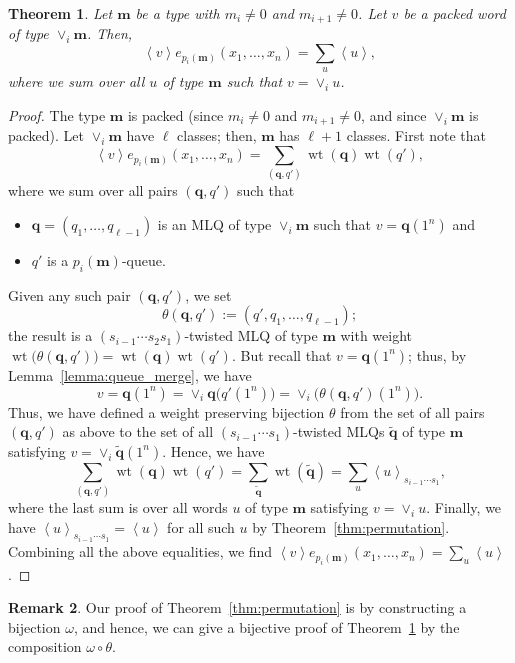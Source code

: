 \documentclass[reqno]{amsart}
\newcommand{\0}{\phantom{c}}
\newcommand{\swt}[1]{\left\langle #1 \right\rangle} %
\newcommand{\merge}[1]{\vee_{#1}} %
\DeclareMathOperator{\wt}{wt} %
\newcommand{\mm}{\mathbf{m}}
\newcommand{\qq}{\mathbf{q}}
\let\sumnonlimits\sum
\renewcommand{\sum}{\sumnonlimits\limits}
\newcommand{\tup}[1]{\left( #1 \right)}
\theoremstyle{plain}
\newtheorem{thm}{Theorem}[section]
\theoremstyle{definition}
\newtheorem{remark}[thm]{Remark}
\numberwithin{equation}{section}
\begin{document}
\begin{thm}
\label{thm:merge}
  Let $\mm$ be a type with $m_i \neq 0$ and $m_{i+1} \neq 0$.
  Let $v$ be a packed word of type $\merge{i}\mm$.
  Then,
  \[
  \swt{v} e_{p_i(\mm)}(x_1, \dotsc, x_n) = \sum_u \swt{u},
  \]
where we sum over all $u$ of type $\mm$ such that $v = \merge{i} u$.
\end{thm}

\begin{proof}
  The type $\mm$ is packed (since $m_i \neq 0$ and $m_{i+1} \neq 0$,
  and since $\merge{i}\mm$ is packed).
  Let $\merge{i}\mm$ have $\ell$ classes; then, $\mm$ has $\ell+1$
  classes.
  First note that
  \[
  \swt{v} e_{p_i(\mm)}(x_1, \dotsc, x_n) = \sum_{(\qq,q')} \wt(\qq) \wt(q'),
  \]
  where we sum over all pairs $(\qq, q')$ such that
  \begin{itemize}
  \item $\qq = (q_1, \dotsc, q_{\ell-1})$ is an MLQ of type $\merge{i}\mm$ such that $v = \qq(1^n)$ and
  \item $q'$ is a $p_i(\mm)$-queue.
  \end{itemize}
  Given any such pair $\tup{\qq, q'}$, we set
  \[
  \theta(\qq, q') := (q', q_1, \dotsc, q_{\ell-1});
  \]
  the result is a $(s_{i-1} \dotsm s_2 s_1)$-twisted MLQ of type $\mm$ with weight
  $\wt\bigl( \theta(\qq, q') \bigr) = \wt(\qq) \wt(q')$.
  But recall that $v = \qq(1^n)$; thus, by Lemma~\ref{lemma:queue_merge}, we have
  \[
  v = \qq(1^n) = \merge{i} \qq\bigl( q'(1^n) \bigr) = \merge{i} \bigl( \theta(\qq, q')(1^n) \bigr).
  \]
  Thus, we have defined a weight preserving bijection $\theta$ from the set of all pairs $(\qq, q')$ as above
  to the set of all $(s_{i-1} \dotsm s_1)$-twisted MLQs $\widetilde{\qq}$ of type $\mm$ satisfying $v = \merge{i} \widetilde{\qq} (1^n)$.
  Hence, we have
  \[
  \sum_{(\qq,q')} \wt(\qq) \wt(q')
  = \sum_{\widetilde{\qq}} \wt(\widetilde{\qq})
  = \sum_u \swt{u}_{s_{i-1} \dotsm s_1} ,
  \]
  where the last sum is over all words $u$ of type $\mm$ satisfying $v = \merge{i} u$.
  Finally, we have $\swt{u}_{s_{i-1} \dotsm s_1} = \swt{u}$ for all such $u$ by Theorem~\ref{thm:permutation}.
  Combining all the above equalities, we find $\swt{v} e_{p_i(\mm)}(x_1, \dotsc, x_n) = \sum_u \swt{u}$.
\end{proof}

\begin{remark}
\label{rmk:bijective_proof}
Our proof of Theorem~\ref{thm:permutation} is by constructing a bijection $\omega$, and hence, we can give a bijective proof of Theorem~\ref{thm:merge} by the composition $\omega \circ \theta$.
\end{remark}
\end{document}
